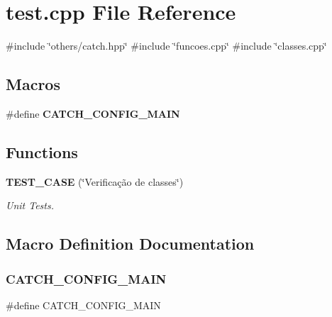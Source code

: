 \section{test.\+cpp File Reference}
\label{test_8cpp}
{\ttfamily \#include \char`\"{}others/catch.\+hpp\char`\"{}}\newline
{\ttfamily \#include \char`\"{}funcoes.\+cpp\char`\"{}}\newline
{\ttfamily \#include \char`\"{}classes.\+cpp\char`\"{}}\newline
\subsection*{Macros}
\begin{DoxyCompactItemize}
\item 
\#define \textbf{ C\+A\+T\+C\+H\+\_\+\+C\+O\+N\+F\+I\+G\+\_\+\+M\+A\+IN}
\end{DoxyCompactItemize}
\subsection*{Functions}
\begin{DoxyCompactItemize}
\item 
\textbf{ T\+E\+S\+T\+\_\+\+C\+A\+SE} (\char`\"{}Verificação de classes\char`\"{})
\begin{DoxyCompactList}\small\item\em Unit Tests. \end{DoxyCompactList}\end{DoxyCompactItemize}


\subsection{Macro Definition Documentation}
\mbox{\label{test_8cpp_a656eb5868e824d59f489f910db438420}} 
\subsubsection{C\+A\+T\+C\+H\+\_\+\+C\+O\+N\+F\+I\+G\+\_\+\+M\+A\+IN}
{\footnotesize\ttfamily \#define C\+A\+T\+C\+H\+\_\+\+C\+O\+N\+F\+I\+G\+\_\+\+M\+A\+IN}



